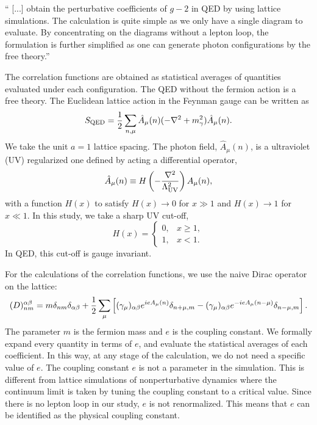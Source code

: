 \begin{description}
``
[...] obtain the perturbative coefficients of
$g-2$ in QED by using lattice simulations.
%
The calculation is quite simple as we only have a single diagram to
evaluate.
%
By concentrating on the diagrams without a lepton loop, the
formulation is further simplified as one can generate photon
configurations by the free theory.''

The correlation functions are 
obtained as statistical averages of quantities evaluated under each 
configuration. 
The QED without the fermion action is a free theory. The Euclidean
lattice action in the Feynman gauge can be written as
\begin{align}
    S_{\rm QED} = {1 \over 2}
    \sum_{n, \mu}
    \hat A_\mu(n) (-\nabla^2 + m_\gamma^2) \hat A_\mu(n).
    \label{Kitano24:eq:action_mod1}
\end{align}
We take the unit $a=1$ lattice spacing. 
%
The photon field, $\hat A_\mu(n)$, is a ultraviolet (UV) regularized
one defined by acting a differential operator,
\[
     \hat A_\mu(n) \equiv H \left( -{\nabla^2 \over \Lambda_{\rm
UV}^2} \right) A_\mu(n),
\]
with a function $H(x)$ to satisfy $H(x) \to 0$ for $x \gg 1$ and $H(x)
\to 1$ for $x \ll 1$.
%
In this study, we take a sharp UV cut-off,
\[
    H(x) = \left \{
        \begin{array}{ll}
            0, & x \ge 1,\\
            1, & x < 1.
        \end{array}
        \right.
\]
In QED, this cut-off is gauge invariant.

For the calculations of the correlation functions, we use the naive
Dirac operator on the lattice:
\[
    (D)_{nm}^{\alpha \beta} = m \delta_{nm} \delta_{\alpha \beta}
   + {1 \over 2} \sum_\mu \left[
   (\gamma_\mu)_{\alpha \beta} e^{i e A_\mu(n)} \delta_{n+\mu,m}
   - (\gamma_\mu)_{\alpha \beta} e^{-i e A_\mu(n-\mu)} \delta_{n-\mu,m}
   \right].
\]
The parameter $m$ is the fermion mass and $e$ is the coupling constant. 
We formally expand every quantity in terms of $e$, and evaluate the 
statistical averages of each coefficient. In this way, at any stage of 
the calculation, we do not need a specific value of $e$. The coupling 
constant $e$ is not a parameter in the simulation. This is different from 
lattice simulations of nonperturbative dynamics where the continuum limit 
is taken by tuning the coupling constant to a critical value. Since there 
is no lepton loop in our study, $e$ is not renormalized. This means 
that $e$ can be identified as the physical coupling constant. 


\end{description}
